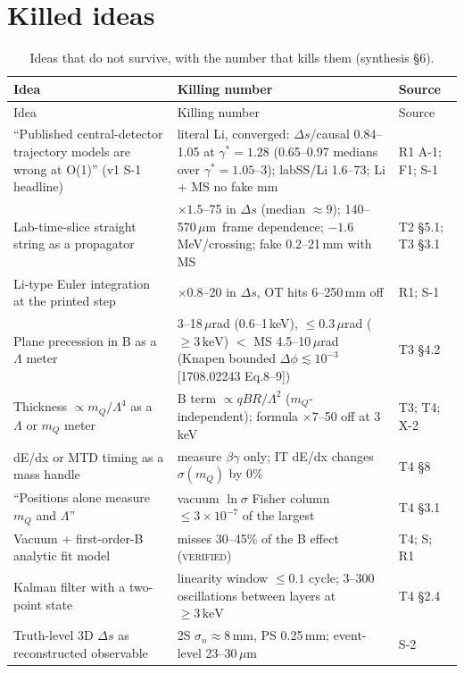 \documentclass[11pt,a4paper]{article}
\newcommand{\VER}{\textsc{verified}}
\newcommand{\mQ}{m_Q}
\newcommand{\keV}{\ensuremath{\,\mathrm{keV}}}
\newcommand{\um}{\ensuremath{\,\mu\mathrm{m}}}
\newcommand{\gst}{\gamma^*}
\newcommand{\Ds}{\Delta s}
\begin{document}
\section{Killed ideas}\label{sec:killed}
{\footnotesize
\begin{longtable}{@{}L{5.6cm}L{7.6cm}L{3.0cm}@{}}
\caption{Ideas that do not survive, with the number that kills them (synthesis \S6).}\label{tab:killed}\\
\toprule Idea & Killing number & Source\\\midrule\endfirsthead
\toprule Idea & Killing number & Source\\\midrule\endhead
\bottomrule\endfoot
``Published central-detector trajectory models are wrong at O(1)'' (v1 S-1 headline) & literal Li, converged: $\Ds$/causal 0.84--1.05 at $\gst=1.28$ (0.65--0.97 medians over $\gst=1.05$--3); labSS/Li 1.6--73; Li + MS no fake mm & R1 A-1; F1; S-1\\
Lab-time-slice straight string as a propagator & $\times1.5$--75 in $\Ds$ (median $\approx9$); 140--570\um\ frame dependence; $-1.6$\,MeV/crossing; fake 0.2--21\,mm with MS & T2 \S5.1; T3 \S3.1\\
Li-type Euler integration at the printed step & $\times0.8$--20 in $\Ds$, OT hits 6--250\,mm off & R1; S-1\\
Plane precession in B as a $\Lambda$ meter & 3--18\,$\mu$rad (0.6--1\,keV), $\le0.3\,\mu$rad ($\ge3\keV$) $<$ MS 4.5--10\,$\mu$rad (Knapen bounded $\Delta\phi\lesssim10^{-3}$ [1708.02243 Eq.8--9]) & T3 \S4.2\\
Thickness $\propto\mQ/\Lambda^4$ as a $\Lambda$ or $\mQ$ meter & B term $\propto qBR/\Lambda^2$ ($\mQ$-independent); formula $\times7$--50 off at 3\,keV & T3; T4; X-2\\
dE/dx or MTD timing as a mass handle & measure $\beta\gamma$ only; IT dE/dx changes $\sigma(\mQ)$ by 0\% & T4 \S8\\
``Positions alone measure $\mQ$ and $\Lambda$'' & vacuum $\ln\sigma$ Fisher column $\le3\times10^{-7}$ of the largest & T4 \S3.1\\
Vacuum + first-order-B analytic fit model & misses 30--45\% of the B effect (\VER{}) & T4; S; R1\\
Kalman filter with a two-point state & linearity window $\le0.1$ cycle; 3--300 oscillations between layers at $\ge3\keV$ & T4 \S2.4\\
Truth-level 3D $\Ds$ as reconstructed observable & 2S $\sigma_n\approx8$\,mm, PS 0.25\,mm; event-level 23--30\um & S-2\\

\end{longtable}}
\end{document}
